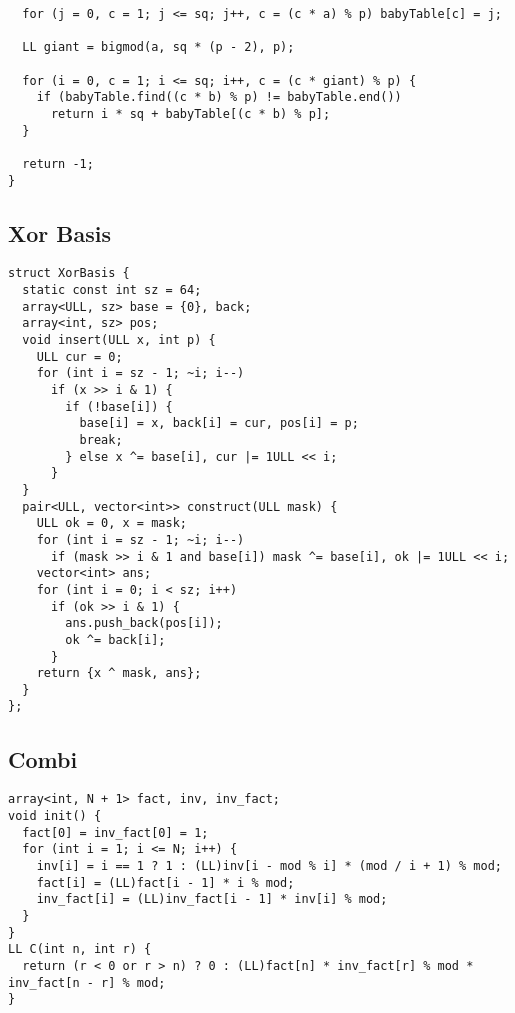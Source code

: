 \documentclass[FSZ,a4paper,onesided]{article}
\begin{document}
\begin{multicols*}{\COLS}
\begin{lstlisting}
  for (j = 0, c = 1; j <= sq; j++, c = (c * a) % p) babyTable[c] = j;

  LL giant = bigmod(a, sq * (p - 2), p);

  for (i = 0, c = 1; i <= sq; i++, c = (c * giant) % p) {
    if (babyTable.find((c * b) % p) != babyTable.end())
      return i * sq + babyTable[(c * b) % p];
  }

  return -1;
}
\end{lstlisting}
\subsection{Xor Basis}
\begin{lstlisting}
struct XorBasis {
  static const int sz = 64;
  array<ULL, sz> base = {0}, back;
  array<int, sz> pos;
  void insert(ULL x, int p) {
    ULL cur = 0;
    for (int i = sz - 1; ~i; i--)
      if (x >> i & 1) {
        if (!base[i]) {
          base[i] = x, back[i] = cur, pos[i] = p;
          break;
        } else x ^= base[i], cur |= 1ULL << i;
      }
  }
  pair<ULL, vector<int>> construct(ULL mask) {
    ULL ok = 0, x = mask;
    for (int i = sz - 1; ~i; i--)
      if (mask >> i & 1 and base[i]) mask ^= base[i], ok |= 1ULL << i;
    vector<int> ans;
    for (int i = 0; i < sz; i++)
      if (ok >> i & 1) {
        ans.push_back(pos[i]);
        ok ^= back[i];
      }
    return {x ^ mask, ans};
  }
};
\end{lstlisting}
\subsection{Combi}
\begin{lstlisting}
array<int, N + 1> fact, inv, inv_fact;
void init() {
  fact[0] = inv_fact[0] = 1;
  for (int i = 1; i <= N; i++) {
    inv[i] = i == 1 ? 1 : (LL)inv[i - mod % i] * (mod / i + 1) % mod;
    fact[i] = (LL)fact[i - 1] * i % mod;
    inv_fact[i] = (LL)inv_fact[i - 1] * inv[i] % mod;
  }
}
LL C(int n, int r) {
  return (r < 0 or r > n) ? 0 : (LL)fact[n] * inv_fact[r] % mod * inv_fact[n - r] % mod;
}
\end{lstlisting}

\end{multicols*}
\end{document}

